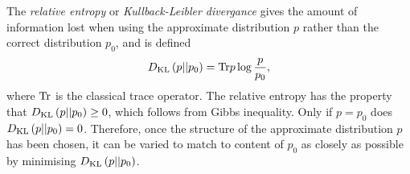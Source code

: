 The {\em relative entropy } or {\em Kullback-Leibler divergance} gives the amount of information lost 
when using the approximate distribution  $p$ rather than the correct distribution $p_0$,
and is defined
\begin{align}
  D_{\text {KL}}\left( {p}||{p_0} \right) = \textrm{Tr} p \log \frac{p}{p_0}, \label{eqn:nuc:KLD}
\end{align}
where $\textrm{Tr}$ is the classical trace operator. %
The relative entropy has the property that 
$D_{\text {KL}}\left( {p}||{p_0} \right) \ge 0$, which follows from Gibbs inequality\cite{MacKayBook}.
Only if $p=p_0$ does $D_{\text {KL}}\left( {p}||{p_0} \right) = 0$.
Therefore, once the structure of the approximate  distribution $p$ has been chosen,
it can be varied to match to content of $p_0$ as closely as possible by minimising $D_{\text {KL}}\left( {p}||{p_0} \right)$.

